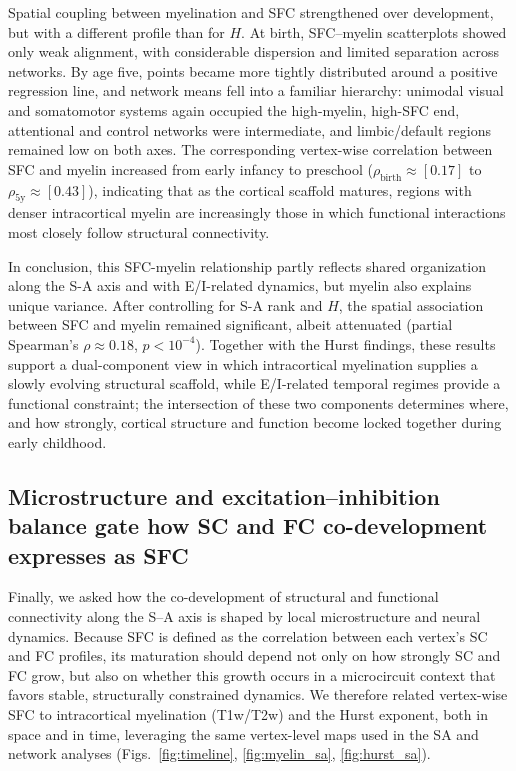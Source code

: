 Spatial coupling between myelination and SFC strengthened over development, but with a different profile than for $H$. At birth, SFC–myelin scatterplots showed only weak alignment, with considerable dispersion and limited separation across networks. By age five, points became more tightly distributed around a positive regression line, and network means fell into a familiar hierarchy: unimodal visual and somatomotor systems again occupied the high-myelin, high-SFC end, attentional and control networks were intermediate, and limbic/default regions remained low on both axes. The corresponding vertex-wise correlation between SFC and myelin increased from early infancy to preschool ($\rho_{\text{birth}} \approx [0.17]$ to $\rho_{\text{5y}} \approx [0.43]$), indicating that as the cortical scaffold matures, regions with denser intracortical myelin are increasingly those in which functional interactions most closely follow structural connectivity.

In conclusion, this SFC-myelin relationship partly reflects shared organization along the S-A axis and with E/I-related dynamics, but myelin also explains unique variance. After controlling for S-A rank and $H$, the spatial association between SFC and myelin remained significant, albeit attenuated (partial Spearman's $\rho \approx 0.18$, $p < 10^{-4}$). Together with the Hurst findings, these results support a dual-component view in which intracortical myelination supplies a slowly evolving structural scaffold, while E/I-related temporal regimes provide a functional constraint; the intersection of these two components determines where, and how strongly, cortical structure and function become locked together during early childhood.



\subsection{Microstructure and excitation--inhibition balance gate how SC and FC co-development expresses as SFC}

Finally, we asked how the co-development of structural and functional connectivity along the S--A axis is shaped by local microstructure and neural dynamics. Because SFC is defined as the correlation between each vertex's SC and FC profiles, its maturation should depend not only on how strongly SC and FC grow, but also on whether this growth occurs in a microcircuit context that favors stable, structurally constrained dynamics. We therefore related vertex-wise SFC to intracortical myelination (T1w/T2w) and the Hurst exponent, both in space and in time, leveraging the same vertex-level maps used in the SA and network analyses (Figs.~\ref{fig:timeline}, \ref{fig:myelin_sa}, \ref{fig:hurst_sa}).

